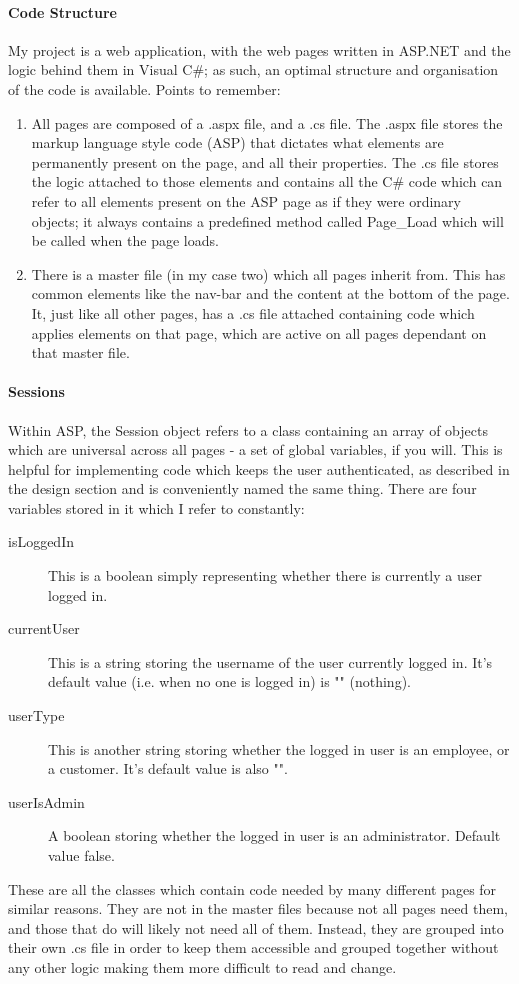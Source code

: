 ﻿\documentclass{article}
\begin{document}
    \paragraph{Code Structure}
    My project is a web application, with the web pages written in ASP.NET and the logic behind them in Visual C\#; as such, an optimal structure and organisation of the code is available.
    Points to remember:
    \begin{enumerate}
        \item All pages are composed of a .aspx file, and a .cs file.
        The .aspx file stores the markup language style code (ASP) that dictates what elements are permanently present on the page, and all their properties.
        The .cs file stores the logic attached to those elements and contains all the C\# code which can refer to all elements present on the ASP page as if they were ordinary objects; it always contains a predefined method called Page\_Load which will be called when the page loads.
        \item There is a master file (in my case two) which all pages inherit from.
        This has common elements like the nav-bar and the content at the bottom of the page.
        It, just like all other pages, has a .cs file attached containing code which applies elements on that page, which are active on all pages dependant on that master file.        
    \end{enumerate}
    \paragraph{Sessions}
    Within ASP, the Session object refers to a class containing an array of objects which are universal across all pages - a set of global variables, if you will.
    This is helpful for implementing code which keeps the user authenticated, as described in the design section and is conveniently named the same thing.
    There are four variables stored in it which I refer to constantly:
    \begin{description}
        \item[isLoggedIn] This is a boolean simply representing whether there is currently a user logged in.
        \item[currentUser] This is a string storing the username of the user currently logged in.
        It's default value (i.e. when no one is logged in) is "" (nothing).
        \item[userType] This is another string storing whether the logged in user is an employee, or a customer.
        It's default value is also "".
        \item[userIsAdmin] A boolean storing whether the logged in user is an administrator.
        Default value false.
    \end{description}
    \newpage
    These are all the classes which contain code needed by many different pages for similar reasons.
    They are not in the master files because not all pages need them, and those that do will likely not need all of them.
    Instead, they are grouped into their own .cs file in order to keep them accessible and grouped together without any other logic making them more difficult to read and change.
    \newpage
\end{document}
